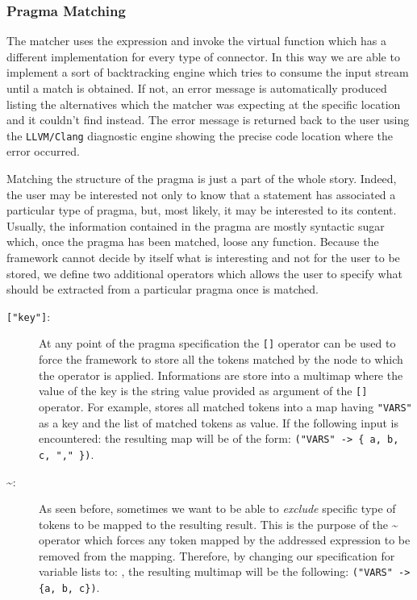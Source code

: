\subsubsection{Pragma Matching}

The matcher uses the expression and invoke the  virtual function
which has a different implementation for every type of connector. In this way we
are able to implement a sort of backtracking engine which tries to consume the
input stream until a match is obtained. If not, an error message is
automatically produced listing the alternatives which the matcher was expecting
at the specific location and it couldn't find instead. The error message is
returned back to the user using the {\tt LLVM/Clang} diagnostic engine showing
the precise code location where the error occurred. 

Matching the structure of the pragma is just a part of the whole story. Indeed,
the user may be interested not only to know that a statement has associated a
particular type of pragma, but, most likely, it may be interested to its
content.  Usually, the information contained in the pragma are mostly syntactic
sugar which, once the pragma has been matched, loose any function. Because the
framework cannot decide by itself what is interesting and not for the user to be
stored, we define two additional operators which allows the user to specify what
should be extracted from a particular pragma once is matched. 

\begin{description}
\item [{\tt["key"]}:] At any point of the pragma specification the {\tt []}
operator can be used to force the framework to store all the tokens matched by
the node to which the operator is applied. Informations are store into a
multimap where the value of the key is the string value provided as argument of
the {\tt []} operator. 
For example,  stores all matched
tokens into a map having {\tt "VARS"} as a key and the list of matched tokens as
value. If the following input is encountered:  the resulting
map will be of the form: {\tt ("VARS" -> \{ a, b, c, "," \})}. 

\item [\~{}:] As seen before, sometimes we want to be able to {\em exclude}
specific type of tokens to be mapped to the resulting result. This is the
purpose of the \~{} operator which forces any token mapped by the addressed
expression to be removed from the mapping. Therefore, by changing our
specification for variable lists to: , the resulting multimap will be the following:  {\tt ("VARS" ->
\{a, b, c\})}.

\end{description}

